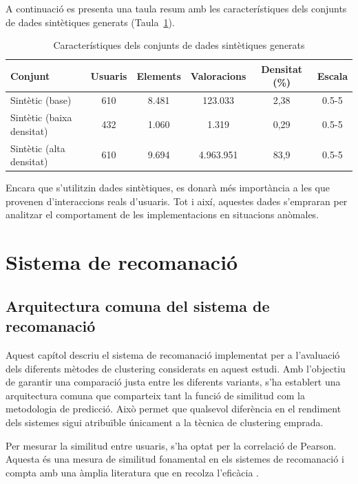 \documentclass[a4paper,12pt]{report}
\begin{document}
A continuació es presenta una taula resum amb les característiques dels conjunts de dades sintètiques generats (Taula~\ref{tab:datasets_synthetic}).

\begin{table}[H]
    \centering
    \begin{tabular}{|l|c|c|c|c|c|}
    \hline
    \textbf{Conjunt} & \textbf{Usuaris} & \textbf{Elements} & \textbf{Valoracions} & \textbf{Densitat (\%)} & \textbf{Escala} \\ \hline
    Sintètic (base) & 610   & 8.481 & 123.033 & 2,38 & 0.5-5  \\ \hline
    Sintètic (baixa densitat) & 432   & 1.060 & 1.319  & 0,29 & 0.5-5 \\ \hline
    Sintètic (alta densitat)        & 610   & 9.694 & 4.963.951 & 83,9 & 0.5-5 \\ \hline
    \end{tabular}
    \caption{Característiques dels conjunts de dades sintètiques generats}
    \label{tab:datasets_synthetic}
\end{table}

Encara que s’utilitzin dades sintètiques, es donarà més importància a les que provenen d’interaccions reals d’usuaris. Tot i així, aquestes dades s’empraran per analitzar el comportament de les implementacions en situacions anòmales.

\chapter{Sistema de recomanació}

\section{Arquitectura comuna del sistema de recomanació}

Aquest capítol descriu el sistema de recomanació implementat per a l’avaluació dels diferents mètodes de clustering considerats en aquest estudi. Amb l’objectiu de garantir una comparació justa entre les diferents variants, s’ha establert una arquitectura comuna que comparteix tant la funció de similitud com la metodologia de predicció. Això permet que qualsevol diferència en el rendiment dels sistemes sigui atribuïble únicament a la tècnica de clustering emprada.

Per mesurar la similitud entre usuaris, s’ha optat per la correlació de Pearson. Aquesta és una mesura de similitud fonamental en els sistemes de recomanació i compta amb una àmplia literatura que en recolza l’eficàcia \cite{chowdhury2024evaluating}.
\end{document}
